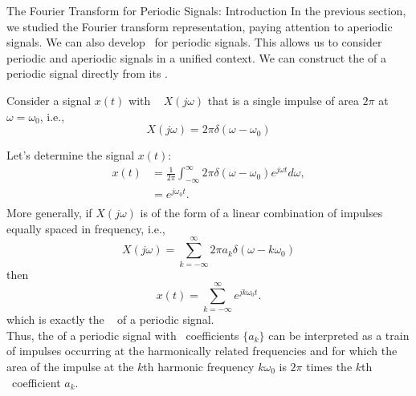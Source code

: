 
\begin{frame}{The Fourier Transform for Periodic Signals: Introduction}
    In the previous section, we studied the Fourier transform representation, paying attention to aperiodic signals. We can also develop \ftrs~for periodic signals. This allows us to consider periodic and aperiodic signals in a unified context. We can construct the \ft of a periodic signal directly from its \fsr .
    
    Consider a signal $x(t)$  with \ft~ $X(j\omega)$ that is a single impulse of area $2\pi$ at $\omega=\omega_0$, i.e.,
    \begin{equation}
        X(j\omega) = 2\pi \delta(\omega-\omega_0)
    \end{equation}
\end{frame}
    
\begin{frame}    
    Let's determine the signal $x(t)$:
    \pause
    {
        \begin{equation*}
            \begin{split}
                x(t) &= \frac{1}{2\pi}\int_{-\infty}^{\infty} 2\pi \delta(\omega-\omega_0)e^{j\omega t} d\omega,\\
                &= e^{j\omega_0 t}.\\
            \end{split}
        \end{equation*}
        \pause
        More generally, if $X(j\omega)$ is of the form of a linear combination of impulses equally spaced in frequency, i.e.,
        \begin{equation}
             X(j\omega) = \sum_{k=-\infty}^{\infty}2\pi a_k \delta(\omega-k\omega_0)
        \end{equation}
        \pause
        then
        \begin{equation}
            x(t) = \sum_{k=-\infty}^{\infty}e^{jk\omega_0 t}.
        \end{equation}
        which is exactly the \fsr~ of a periodic signal. \\
        Thus, the \ft of a periodic signal with \fs~coefficients $\{a_k\}$ can be interpreted as a train of impulses occurring at the harmonically related frequencies and for which the area of the impulse at the $k$th harmonic frequency $k\omega_0$ is $2\pi$ times the $k$th \fs~coefficient $a_k$.
    }

\end{frame} 


